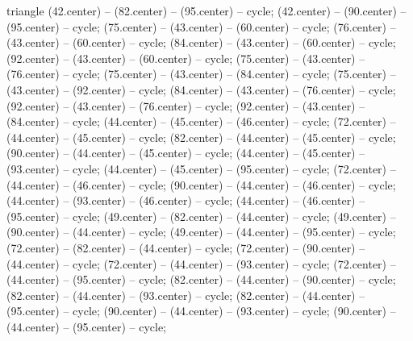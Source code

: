 {\begin{pgfonlayer}{triangle}
 (42.center) -- (82.center) -- (95.center) -- cycle; 
 (42.center) -- (90.center) -- (95.center) -- cycle; 
 (75.center) -- (43.center) -- (60.center) -- cycle; 
 (76.center) -- (43.center) -- (60.center) -- cycle; 
 (84.center) -- (43.center) -- (60.center) -- cycle; 
 (92.center) -- (43.center) -- (60.center) -- cycle; 
 (75.center) -- (43.center) -- (76.center) -- cycle; 
 (75.center) -- (43.center) -- (84.center) -- cycle; 
 (75.center) -- (43.center) -- (92.center) -- cycle; 
 (84.center) -- (43.center) -- (76.center) -- cycle; 
 (92.center) -- (43.center) -- (76.center) -- cycle; 
 (92.center) -- (43.center) -- (84.center) -- cycle; 
 (44.center) -- (45.center) -- (46.center) -- cycle; 
 (72.center) -- (44.center) -- (45.center) -- cycle; 
 (82.center) -- (44.center) -- (45.center) -- cycle; 
 (90.center) -- (44.center) -- (45.center) -- cycle; 
 (44.center) -- (45.center) -- (93.center) -- cycle; 
 (44.center) -- (45.center) -- (95.center) -- cycle; 
 (72.center) -- (44.center) -- (46.center) -- cycle; 
 (90.center) -- (44.center) -- (46.center) -- cycle; 
 (44.center) -- (93.center) -- (46.center) -- cycle; 
 (44.center) -- (46.center) -- (95.center) -- cycle; 
 (49.center) -- (82.center) -- (44.center) -- cycle; 
 (49.center) -- (90.center) -- (44.center) -- cycle; 
 (49.center) -- (44.center) -- (95.center) -- cycle; 
 (72.center) -- (82.center) -- (44.center) -- cycle; 
 (72.center) -- (90.center) -- (44.center) -- cycle; 
 (72.center) -- (44.center) -- (93.center) -- cycle; 
 (72.center) -- (44.center) -- (95.center) -- cycle; 
 (82.center) -- (44.center) -- (90.center) -- cycle; 
 (82.center) -- (44.center) -- (93.center) -- cycle; 
 (82.center) -- (44.center) -- (95.center) -- cycle; 
 (90.center) -- (44.center) -- (93.center) -- cycle; 
 (90.center) -- (44.center) -- (95.center) -- cycle; 

\end{pgfonlayer}}
